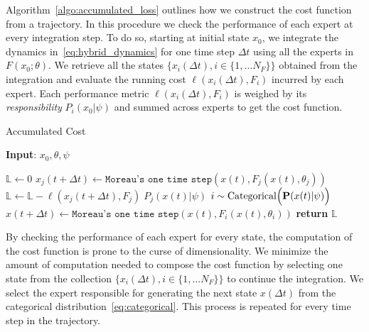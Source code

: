 \begin{enumerate}
    Algorithm~\eqref{algo:accumulated_loss} outlines how we construct the
    cost function from a trajectory.
    In this procedure we check the performance of each expert at every
    integration step.
    To do so, starting at initial state $x_0$, we integrate the dynamics
    in~\eqref{eq:hybrid_dynamics} for one time step $\Delta t$ using all the
    experts in $F(x_0;\theta)$.
    We retrieve all the states $\{ x_i(\Delta t) , i \in \{1, \dots N_F \}\}$
    obtained from the integration and evaluate the running cost $\ell(x_i(\Delta
    t), F_i)$ incurred by each expert.
    Each performance metric $\ell(x_i(\Delta t), F_i)$ is weighed by its
    \textit{responsibility} $P_i(x_0 | \psi)$ and summed across experts to get
    the cost function.
    \begin{algorithm}[tb]
        \caption{Accumulated Cost}
        \label{algo:accumulated_loss}
        \small
        \hspace*{\algorithmicindent} \textbf{Input}: $x_0, \theta, \psi$
        \begin{algorithmic}[1]
            \State $\mathbb{L} \leftarrow 0$
                    \State $x_j(t+\Delta t) \leftarrow \texttt{Moreau's one time step}(x(t), F_j(x(t), \theta_j))$
                    \State $\mathbb{L} \leftarrow \mathbb{L} - \ell(x_j(t+\Delta t), F_j) \; P_j(x(t) | \psi)$
                \EndFor
                \State $i \sim \text{Categorical}\Bigl(\mathbf{P}(x(t)| \psi)\Bigr)$ 
                \State $x(t + \Delta t) \leftarrow \texttt{Moreau's one time step}(x(t), F_i(x(t), \theta_i))$
                \EndFor
            \State \textbf{return} $\mathbb{L}$
        \end{algorithmic}
    \end{algorithm}
    By checking the performance of each expert for every state, the computation
    of the cost function is prone to the curse of dimensionality.
    We minimize the amount of computation needed to compose the cost function by
    selecting one state from the collection $\{ x_i(\Delta t) , i \in \{1,
    \dots N_F \}\}$ to continue the integration.
    We select the expert responsible for generating the next state $x(\Delta t)$
    from the categorical distribution~\eqref{eq:categorical}.
    This process is repeated for every time step in the trajectory.


\end{enumerate}
